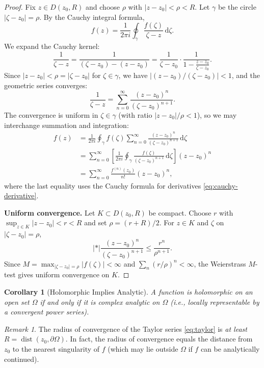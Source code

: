 \documentclass[12pt,a4paper,openany]{book}
\theoremstyle{definition}
\theoremstyle{plain}
\newtheorem{corollary}[definition]{Corollary}
\theoremstyle{remark}
\newtheorem{remark}[definition]{Remark}
\newcommand{\dd}{\mathrm{d}}
\newcommand{\abs}[1]{\left|#1\right|}
\begin{document}
\begin{proof}
Fix $z\in D(z_0,R)$ and choose $\rho$ with $\abs{z-z_0}<\rho<R$. Let
$\gamma$ be the circle $\abs{\zeta-z_0}=\rho$. By the Cauchy integral formula,
\[
  f(z) = \frac{1}{2\pi i}\oint_\gamma\frac{f(\zeta)}{\zeta-z}\,\dd\zeta.
\]
We expand the Cauchy kernel:
\[
  \frac{1}{\zeta-z}
  = \frac{1}{(\zeta-z_0)-(z-z_0)}
  = \frac{1}{\zeta-z_0}\cdot\frac{1}{1-\frac{z-z_0}{\zeta-z_0}}.
\]
Since $\abs{z-z_0}<\rho=\abs{\zeta-z_0}$ for $\zeta\in\gamma$, we have
$\abs{(z-z_0)/(\zeta-z_0)}<1$, and the geometric series converges:
\[
  \frac{1}{\zeta-z}
  = \sum_{n=0}^{\infty}\frac{(z-z_0)^n}{(\zeta-z_0)^{n+1}}.
\]
The convergence is uniform in $\zeta\in\gamma$ (with ratio $\abs{z-z_0}/\rho<1$),
so we may interchange summation and integration:
\begin{align*}
  f(z)
  &= \frac{1}{2\pi i}\oint_\gamma f(\zeta)\sum_{n=0}^{\infty}
     \frac{(z-z_0)^n}{(\zeta-z_0)^{n+1}}\,\dd\zeta \\
  &= \sum_{n=0}^{\infty}\left[\frac{1}{2\pi i}\oint_\gamma
     \frac{f(\zeta)}{(\zeta-z_0)^{n+1}}\,\dd\zeta\right](z-z_0)^n \\
  &= \sum_{n=0}^{\infty}\frac{f^{(n)}(z_0)}{n!}(z-z_0)^n,
\end{align*}
where the last equality uses the Cauchy formula for derivatives \eqref{eq:cauchy-derivative}.

\medskip\noindent
\textbf{Uniform convergence.}
Let $K\subset D(z_0,R)$ be compact. Choose $r$ with $\sup_{z\in K}\abs{z-z_0}<r<R$
and set $\rho=(r+R)/2$. For $z\in K$ and $\zeta$ on $\abs{\zeta-z_0}=\rho$,
\[
  \abs*{\frac{(z-z_0)^n}{(\zeta-z_0)^{n+1}}}
  \le \frac{r^n}{\rho^{n+1}}.
\]
Since $M=\max_{\abs{\zeta-z_0}=\rho}\abs{f(\zeta)}<\infty$ and
$\sum_n(r/\rho)^n<\infty$, the Weierstrass $M$-test gives uniform convergence on $K$.
\end{proof}

\begin{corollary}[Holomorphic Implies Analytic]\label{cor:holomorphic-analytic}
A function is holomorphic on an open set $\Omega$ if and only if it is complex
analytic on $\Omega$ (i.e., locally representable by a convergent power series).
\end{corollary}

\begin{remark}\label{rem:radius-convergence}
The radius of convergence of the Taylor series \eqref{eq:taylor} is
\emph{at least} $R=\operatorname{dist}(z_0,\partial\Omega)$. In fact, the
radius of convergence equals the distance from $z_0$ to the nearest singularity
of $f$ (which may lie outside $\Omega$ if $f$ can be analytically continued).
\end{remark}
\end{document}
